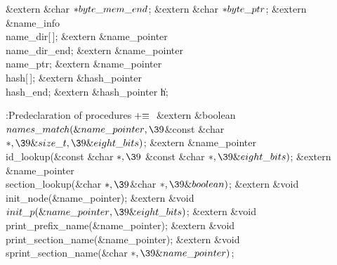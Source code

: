 \&{extern} \&{char} ${}{*}\\{byte\_mem\_end}{}$;%
\6
\&{extern} \&{char} ${}{*}\\{byte\_ptr}{}$;\6
\&{extern} \&{name\_info} \\{name\_dir}[\,];\6
\&{extern} \&{name\_pointer} \\{name\_dir\_end};%
\6
\&{extern} \&{name\_pointer} \\{name\_ptr};\6
\&{extern} \&{name\_pointer} \\{hash}[\,];\6
\&{extern} \&{hash\_pointer} \\{hash\_end};\6
\&{extern} \&{hash\_pointer} \|h;\par
\fi

\B{}:Predeclaration of procedures\X${}\mathrel+\equiv{}$\6
\&{extern} \&{boolean} ${}\\{names\_match}(\&{name\_pointer},\39{}$\&{const} %
\&{char} ${}{*},\39\&{size\_t},\39\&{eight\_bits}){}$;\6
\&{extern} \&{name\_pointer} \\{id\_lookup}(\&{const} \&{char} ${}{*},\39{}$%
\&{const} \&{char} ${}{*},\39\&{eight\_bits}){}$;\6
\&{extern} \&{name\_pointer} \\{section\_lookup}(\&{char} ${}{*},\39{}$\&{char}
${}{*},\39\&{boolean}){}$;\6
\&{extern} \&{void} \\{init\_node}(\&{name\_pointer});\6
\&{extern} \&{void} ${}\\{init\_p}(\&{name\_pointer},\39\&{eight\_bits}){}$;\6
\&{extern} \&{void} \\{print\_prefix\_name}(\&{name\_pointer});\6
\&{extern} \&{void} \\{print\_section\_name}(\&{name\_pointer});\6
\&{extern} \&{void} \\{sprint\_section\_name}(\&{char} ${}{*},\39\&{name%
\_pointer}){}$;\par
\fi

